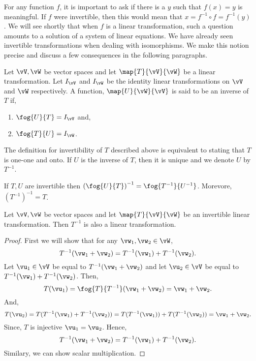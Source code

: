 For any function $f$, it is important to ask if there is a $y$ such that $f(x) = y$ is meaningful. If $f$ were
invertible, then this would mean that $x = f^{-1}\circ f = f^{-1}(y)$. We will see shortly that when $f$ is a
linear transformation, such a question amounts to a solution of a system of linear equations. We have already
seen invertible transformations when dealing with isomorphisms. We make this notion precise and discuss a few
consequences in the following paragraphs. 

\begin{Definition}
    Let $\vV,\vW$ be vector spaces and let $\map{T}{\vV}{\vW}$ be a linear transformation. Let $I_{\vV}$ and
    $I_{\vW}$ be the identity linear transformations on $\vV$ and $\vW$ respectively. A function,
    $\map{U}{\vW}{\vV}$ is said to be an inverse of $T$ if,
    \begin{enumerate}
	\item
	    $\fog{U}{T} = I_{\vV}$ and,
	\item
	    $\fog{T}{U} = I_{\vW}$.
    \end{enumerate}
\end{Definition}
\begin{Remark}
    The definition for invertibility of $T$ described above is equivalent to stating that $T$ is one-one and
    onto. If $U$ is the inverse of $T$, then it is unique and we denote $U$ by $T^{-1}$.
\end{Remark}
\begin{Remark}
    If $T,U$ are invertible then ${(\fog{U}{T})}^{-1} = \fog{T^{-1}}{U^{-1}}$. Morevore, ${(T^{-1})}^{-1} =
    T$.
\end{Remark}
\begin{Theorem}
    Let $\vV,\vW$ be vector spaces and let $\map{T}{\vV}{\vW}$ be an invertible linear transformation. Then
    $T^{-1}$ is also a linear transformation.
\end{Theorem}
\begin{proof}
    First we will show that for any $\vw_1,\vw_2 \in \vW$, 
    \[T^{-1}(\vw_1 + \vw_2) = T^{-1}(\vw_1) + T^{-1}(\vw_2).\]
    Let $\vu_1 \in \vV $ be equal to $T^{-1}(\vw_1 + \vw_2)$ and let $\vu_2 \in \vV$ be equal to 
    $T^{-1}(\vw_1) + T^{-1}(\vw_2)$. Then,
    \[T(\vu_1) = \fog{T}{T^{-1}}(\vw_1 + \vw_2) = \vw_1 + \vw_2.\]
    And,
    \[T(\vu_2) = T(T^{-1}(\vw_1) + T^{-1}(\vw_2)) = T(T^{-1}(\vw_1)) + T(T^{-1}(\vw_2)) = \vw_1 + \vw_2.\]
    Since, $T$ is injective $\vu_1 = \vu_2$. Hence, 
    \[T^{-1}(\vw_1 + \vw_2) = T^{-1}(\vw_1) + T^{-1}(\vw_2).\]
    Similary, we can show scalar multiplication.
\end{proof}
